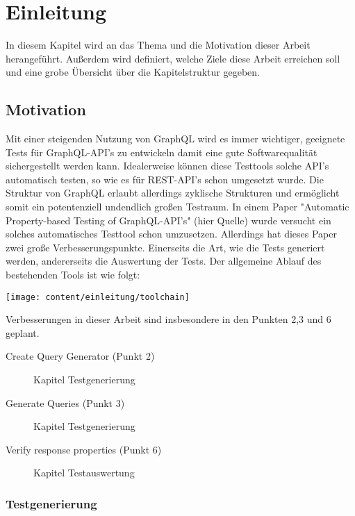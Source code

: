 \chapter{Einleitung}

In diesem Kapitel wird an das Thema und die Motivation dieser Arbeit herangeführt.
Außerdem wird definiert, welche Ziele diese Arbeit erreichen soll und eine grobe Übersicht über die
Kapitelstruktur gegeben.

\section{Motivation}

Mit einer steigenden Nutzung von GraphQL wird es immer wichtiger, geeignete Tests für GraphQL-API's zu entwickeln damit eine
gute Softwarequalität sichergestellt werden kann. Idealerweise können diese Testtools solche API's automatisch testen,
so wie es für REST-API's schon umgesetzt wurde. Die Struktur von GraphQL erlaubt allerdings zyklische Strukturen
und ermöglicht somit ein potentenziell undendlich großen Testraum.
In einem Paper "Automatic Property-based Testing of GraphQL-API's" (hier Quelle) wurde versucht ein solches
automatisches Testtool schon umzusetzen. Allerdings hat dieses Paper zwei große Verbesserungspunkte. 
Einerseits die Art, wie die Tests generiert werden, andererseits die Auswertung der Tests.
Der allgemeine Ablauf des bestehenden Tools ist wie folgt:
\begin{center}
    \texttt{[image: content/einleitung/toolchain]}
\end{center}

Verbesserungen in dieser Arbeit sind insbesondere in den Punkten 2,3 und 6 geplant.

\begin{description}
    \item[Create Query Generator (Punkt 2)] Kapitel Testgenerierung
    \item[Generate Queries (Punkt 3)]  Kapitel Testgenerierung
    \item[Verify response properties (Punkt 6)] Kapitel Testauswertung
\end{description}

\subsection{Testgenerierung}

